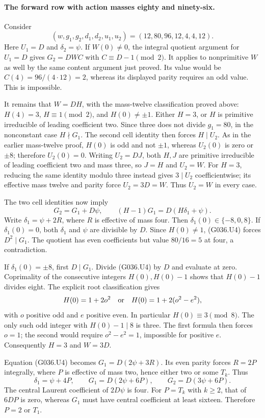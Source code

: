 \paragraph{The forward row with action masses eighty and ninety-six.}
Consider
\[
 (w,g_1,g_2,d_1,d_2,u_1,u_2)
                    =(12,80,96,12,4,4,12).         \tag{G036.U3}
\]
Here $U_1=D$ and $\delta_2=\psi$.
If $W(0)\ne0$, the integral quotient argument for
$U_1=D$ gives
$G_2=DWC$ with $C\equiv D-1\pmod2$.
It applies to nonprimitive $W$ as well by the same
content argument just proved. Its value would be
$C(4)=96/(4\cdot12)=2$, whereas its displayed
parity requires an odd value. This is impossible.

It remains that $W=DH$, with the mass-twelve
classification proved above: $H(4)=3$,
$H\equiv1\pmod2$, and $H(0)\ne\pm1$.
Either $H=3$, or $H$ is primitive irreducible
of leading coefficient two.
Since three does not divide $g_1=80$, in the
nonconstant case $H\nmid G_1$.
The second cell identity then forces $H\mid U_2$.
As in the earlier mass-twelve proof, $H(0)$ is
odd and not $\pm1$, whereas $U_2(0)$ is zero
or $\pm8$; therefore $U_2(0)=0$.
Writing $U_2=DJ$, both $H,J$ are primitive
irreducible of leading coefficient two and mass
three, so $J=H$ and $U_2=W$.
For $H=3$, reducing the same identity modulo
three instead gives $3\mid U_2$ coefficientwise;
its effective mass twelve and parity force
$U_2=3D=W$. Thus $U_2=W$ in every case.

The two cell identities now imply
\[
 G_2=G_1+D\psi,\qquad
                    (H-1)G_1=D(H\delta_1+\psi).     \tag{G036.U4}
\]
Write $\delta_1=\psi+2R$, where $R$ is effective
of mass four. Then $\delta_1(0)\in\{-8,0,8\}$.
If $\delta_1(0)=0$, both $\delta_1$ and $\psi$
are divisible by $D$. Since $H(0)\ne1$,
(G036.U4) forces $D^2\mid G_1$.
The quotient has even coefficients but value
$80/16=5$ at four, a contradiction.

If $\delta_1(0)=\pm8$, first $D\mid G_1$.
Divide (G036.U4) by $D$ and evaluate at zero.
Coprimality of the consecutive integers
$H(0),H(0)-1$ shows that $H(0)-1$ divides eight.
The explicit root classification gives
\[
 H(0)=1+2o^2\quad\hbox{or}\quad
 H(0)=1+2(o^2-e^2),
\]
with $o$ positive odd and $e$ positive even.
In particular $H(0)\equiv3\pmod8$.
The only such odd integer with $H(0)-1\mid8$
is three. The first formula then forces $o=1$;
the second would require $o^2-e^2=1$,
impossible for positive $e$.
Consequently $H=3$ and $W=3D$.

Equation (G036.U4) becomes
$G_1=D(2\psi+3R)$.
Its even parity forces $R=2P$ integrally, where
$P$ is effective of mass two, hence either two
or some $T_k$. Thus
\[
 \delta_1=\psi+4P,\qquad
 G_1=D(2\psi+6P),\qquad
 G_2=D(3\psi+6P).
\]
The central Laurent coefficient of $2D\psi$
is four. For $P=T_k$ with $k\ge2$, that of
$6DP$ is zero, whereas $G_1$ must have central
coefficient at least sixteen.
Therefore $P=2$ or $T_1$.

